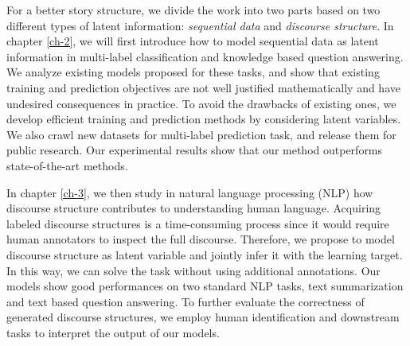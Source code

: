 

For a better story structure, we divide the work into two parts based on two different types of latent information: \textit{sequential data} and \textit{discourse structure}. In chapter \ref{ch-2}, we will first introduce how to model sequential data as latent information in multi-label classification and knowledge based question answering. We analyze existing models proposed for these tasks, and show that existing training and prediction objectives are not well justified mathematically and have undesired consequences in practice. To avoid the drawbacks of existing ones, we develop efficient training and prediction methods by considering latent variables. We also crawl new datasets for multi-label prediction task, and release them for public research. Our experimental results show that our method outperforms state-of-the-art methods. 

In chapter \ref{ch-3}, we then study in natural language processing (NLP) how discourse structure contributes to understanding human language. Acquiring labeled discourse structures is a time-consuming process since it would require human annotators to inspect the full discourse. Therefore, we propose to model discourse structure as latent variable and jointly infer it with the learning target. In this way, we can solve the task without using additional annotations. Our models show good performances on two standard NLP tasks, text summarization and text based question answering. To further evaluate the correctness of generated discourse structures, we employ human identification and downstream tasks to interpret the output of our models.